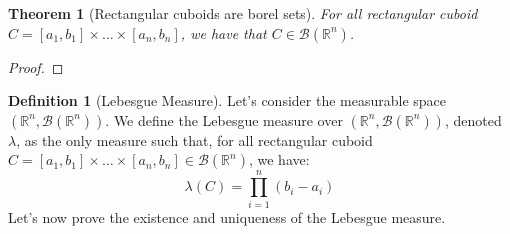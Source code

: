 \documentclass{article}
\newtheorem{theorem}{Theorem}[section]
\theoremstyle{definition}
\newtheorem{definition}{Definition}[section]
\theoremstyle{remark}
\theoremstyle{example}
\begin{document}
\begin{theorem}[Rectangular cuboids are borel sets]
	For all rectangular cuboid $C = [a_1, b_1] \times \dots \times [a_n, b_n]$, we have that $C \in \mathcal{B}(\mathbb{R}^n)$.
\end{theorem}

\begin{proof}
\end{proof}

\begin{definition}[Lebesgue Measure]
    Let's consider the measurable space $(\mathbb{R}^n, \mathcal{B}(\mathbb{R}^n))$. We define the Lebesgue measure over $(\mathbb{R}^n, \mathcal{B}(\mathbb{R}^n))$, denoted $\lambda$, as the only measure such that, for all rectangular cuboid $C = [a_1, b_1] \times \dots \times [a_n, b_n] \in \mathcal{B}(\mathbb{R}^n)$, we have:
        $$\lambda(C) = \prod_{i=1}^n (b_i - a_i)$$
    Let's now prove the existence and uniqueness of the Lebesgue measure. %
\end{definition}
\end{document}
